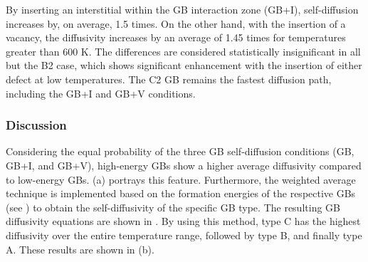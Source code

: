 \documentclass[review]{elsarticle}
\begin{document}
By inserting an interstitial within the GB interaction zone (GB+I), self-diffusion increases by, on average, 1.5 times.
On the other hand, with the insertion of a vacancy, the diffusivity increases by an average of 1.45 times for temperatures greater than 600 K. The differences are considered statistically insignificant in all but the B2 case, which shows significant enhancement with the insertion of either defect at low temperatures.
The C2 GB remains the fastest diffusion path, including the GB+I and GB+V conditions. 




\FloatBarrier
\subsubsection{Discussion}

Considering the equal probability of the three GB self-diffusion conditions (GB, GB+I, and GB+V), high-energy GBs show a higher average diffusivity compared to low-energy GBs.  (a) portrays this feature. Furthermore, the weighted average technique is implemented based on the formation energies of the respective GBs (see ) to obtain the self-diffusivity of the specific GB type. The resulting GB diffusivity equations are shown in . By using this method, type C has the highest diffusivity over the entire temperature range, followed by type B, and finally type A. These results are shown in  (b). %
\end{document}
